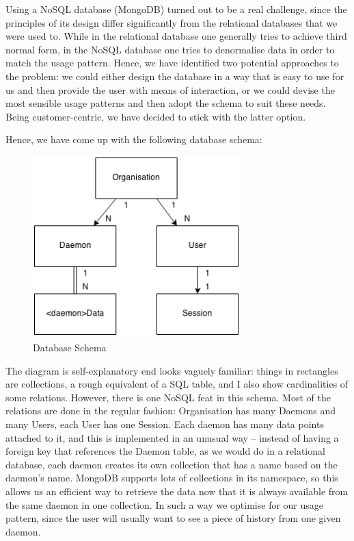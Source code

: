 \documentclass{l3proj}
\begin{document}
Using a NoSQL database (MongoDB) turned out to be a real challenge, since the principles of its design differ significantly from the relational databases that we were used to. While in the relational database one generally tries to achieve third normal form, in the NoSQL database one tries to denormalise data in order to match the usage pattern. Hence, we have identified two potential approaches to the problem: we could either design the database in a way that is easy to use for us and then provide the user with means of interaction, or we could devise the most sensible usage patterns and then adopt the schema to suit these needs. Being customer-centric, we have decided to stick with the latter option.

Hence, we have come up with the following database schema:

\begin{figure}[H]
\centering
\includegraphics[width=80mm]{images/DatabaseSchema.png}
\caption{Database Schema}
\end{figure}

The diagram is self-explanatory end looks vaguely familiar: things in rectangles are collections, a rough equivalent of a SQL table, and I also show cardinalities of some relations. However, there is one NoSQL feat in this schema. Most of the relations are done in the regular fashion: Organisation has many Daemons and many Users, each User has one Session. Each daemon has many data points attached to it, and this is implemented in an unusual way – instead of having a foreign key that references the Daemon table, as we would do in a relational database, each daemon creates its own collection that has a name based on the daemon's name. MongoDB supports lots of collections in its namespace, so this allows us an efficient way to retrieve the data now that it is always available from the same daemon in one collection. In such a way we optimise for our usage pattern, since the user will usually want to see a piece of history from one given daemon.
\end{document}
